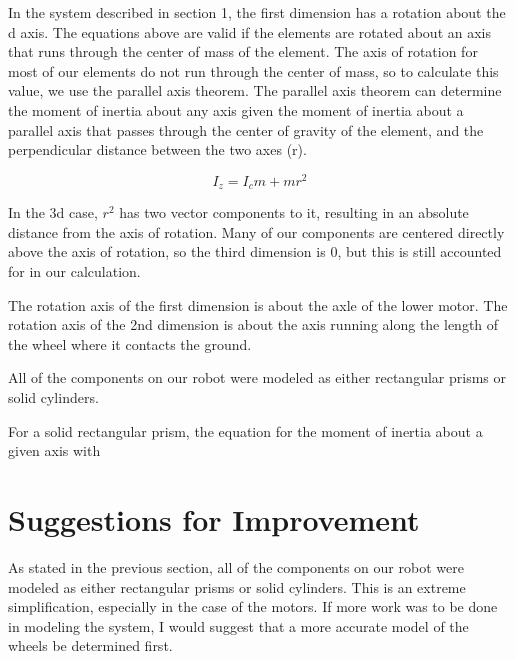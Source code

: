 \documentclass{article}
\begin{document}
In the system described in section 1, the first dimension has a rotation about the d axis.  The equations above are valid if the elements are rotated about an axis that runs through the center of mass of the element.  The axis of rotation for most of our elements do not run through the center of mass, so to calculate this value, we use the parallel axis theorem.  The parallel axis theorem can determine the moment of inertia about any axis given the moment of inertia about a parallel axis that passes through the center of gravity of the element, and the perpendicular distance between the two axes (r).  

\begin{equation}
I_{z} = I_cm + mr^2
\end{equation}


 
In the 3d case, $r^2$ has two vector components to it, resulting in an absolute distance from the axis of rotation.  Many of our components are centered directly above the axis of rotation, so the third dimension is 0, but this is still accounted for in our calculation.

The rotation axis of the first dimension is about the axle of the lower motor.  The rotation axis of the 2nd dimension is about the axis running along the length of the wheel where it contacts the ground.

All of the components on our robot were modeled as either rectangular prisms or solid cylinders.


For a solid rectangular prism, the equation for the moment of inertia about a given axis with 


\newpage
\section{Suggestions for Improvement}
As stated in the previous section, all of the components on our robot were modeled as either rectangular prisms or solid cylinders.  This is an extreme simplification, especially in the case of the motors.  If more work was to be done in modeling the system, I would suggest that a more accurate model of the wheels be determined first.
\end{document}
